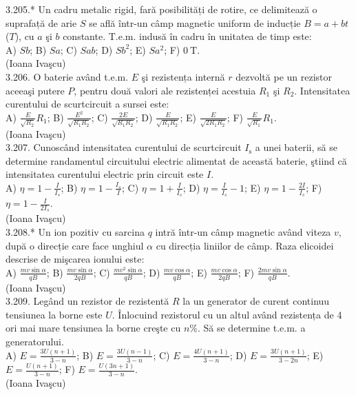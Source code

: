 \documentclass[10pt]{article}
\begin{document}
3.205.* Un cadru metalic rigid, fară posibilități de rotire, ce delimitează o suprafață de arie $S$ se află într-un câmp magnetic uniform de inducție $B=a+b t$ ($T$), cu $a$ şi $b$ constante. T.e.m. indusă în cadru în unitatea de timp este:\\ A) $S b$; B) $S a$; C) $S a b$; D) $S b^{2}$; E) $S a^{2}$; F) $0 \mathrm{~T}$.\\ (Ioana Ivaşcu)\\

3.206. O baterie având t.e.m. $E$ şi rezistența internă $r$ dezvoltă pe un rezistor aceeaşi putere $P$, pentru două valori ale rezistenței acestuia $R_{1}$ şi $R_{2}$. Intensitatea curentului de scurtcircuit a sursei este:\\ A) $\frac{E}{\sqrt{R_{2}}} R_{1}$; B) $\frac{E^{2}}{\sqrt{R_{1} R_{2}}}$; C) $\frac{2 E}{\sqrt{R_{1} R_{2}}}$; D) $\frac{E}{\sqrt{R_{1} R_{2}}}$; E) $\frac{E}{\sqrt{2 R_{1} R_{2}}}$; F) $\frac{E}{\sqrt{R_{1}}} R_{1}$.\\ (Ioana Ivaşcu)\\

3.207. Cunoscând intensitatea curentului de scurtcircuit $I_{\mathrm{s}}$ a unei baterii, să se determine randamentul circuitului electric alimentat de această baterie, ştiind că intensitatea curentului electric prin circuit este $I$.\\ A) $\eta=1-\frac{I}{I_{s}}$; B) $\eta=1-\frac{I_{s}}{I}$; C) $\eta=1+\frac{I}{I_{s}}$; D) $\eta=\frac{I}{I_{s}}-1$; E) $\eta=1-\frac{2 I}{I_{s}}$; F) $\eta=1-\frac{I}{2 I_{s}}$.\\ (Ioana Ivaşcu)\\

3.208.* Un ion pozitiv cu sarcina $q$ intră într-un câmp magnetic având viteza $v$, după o direcție care face unghiul $\alpha$ cu direcția liniilor de câmp. Raza elicoidei descrise de mişcarea ionului este:\\ A) $\frac{m v \sin \alpha}{q B}$; B) $\frac{m v \sin \alpha}{2 q B}$; C) $\frac{m v^{2} \sin \alpha}{q B}$; D) $\frac{m v \cos \alpha}{q B}$; E) $\frac{m v \cos \alpha}{2 q B}$; F) $\frac{2 m v \sin \alpha}{q B}$.\\ (Ioana Ivaşcu)\\

3.209. Legând un rezistor de rezistentă $R$ la un generator de curent continuu tensiunea la borne este $U$. Înlocuind rezistorul cu un altul având rezistența de 4 ori mai mare tensiunea la borne creşte cu $n \%$. Să se determine t.e.m. a generatorului.\\ A) $E=\frac{3 U(n+1)}{3-n}$; B) $E=\frac{3 U(n-1)}{3-n}$; C) $E=\frac{4 U(n+1)}{3-n}$; D) $E=\frac{3 U(n+1)}{3-2 n}$; E) $E=\frac{U(n+1)}{3-n}$; F) $E=\frac{U(3 n+1)}{3-n}$.\\ (Ioana Ivaşcu)\\
\end{document}
